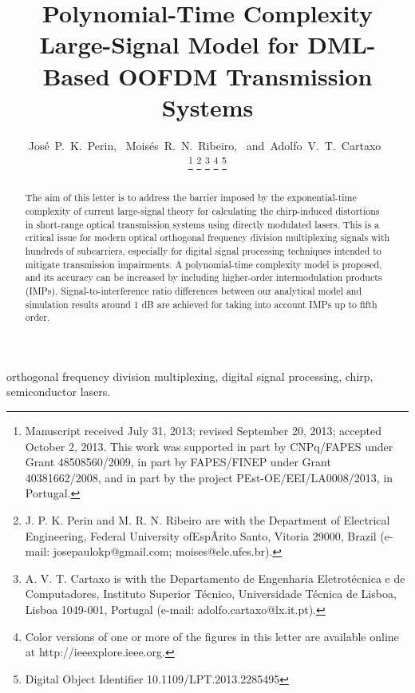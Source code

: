 \documentclass[journal]{IEEEtran}
\makeatletter
\def\markboth#1#2{\def\leftmark{\@IEEEcompsoconly{\sffamily}\MakeUppercase{\protect#1}}%
\def\rightmark{\@IEEEcompsoconly{\sffamily}\MakeUppercase{\protect#2}}}
\makeatother
\begin{document}
 
\title{Polynomial-Time Complexity Large-Signal Model for DML-Based OOFDM Transmission Systems}
\author{José~P.~K.~Perin,~\IEEEmembership{}
        Moisés~R.~N.~Ribeiro,~\IEEEmembership{}
        and~Adolfo~V.~T.~Cartaxo~%

\thanks{Manuscript received July 31, 2013; revised September 20, 2013; accepted October 2, 2013. This work was supported in part by CNPq/FAPES under Grant 48508560/2009, in part by FAPES/FINEP under Grant 40381662/2008, and in part by the project PEst-OE/EEI/LA0008/2013, in Portugal.}
\thanks{J. P. K. Perin and M. R. N. Ribeiro are with the Department of Electrical Engineering, Federal University ofEspÃrito Santo, Vitoria 29000, Brazil (e-mail: josepaulokp@gmail.com; moises@ele.ufes.br).}
\thanks{A. V. T. Cartaxo is with the Departamento de Engenharia Eletrotécnica e de Computadores, Instituto Superior Técnico, Universidade Técnica de Lisboa, Lisboa 1049-001, Portugal (e-mail: adolfo.cartaxo@lx.it.pt).}
\thanks{Color versions of one or more of the figures in this letter are available online at http://ieeexplore.ieee.org.}
\thanks{ Digital Object Identifier 10.1109/LPT.2013.2285495}
}

\markboth{IEEE PHOTONICS TECHNOLOGY LETTERS}{}%
\maketitle
\begin{abstract}
The aim of this letter is to address the barrier imposed by the exponential-time complexity of current large-signal theory for calculating the chirp-induced distortions in short-range optical transmission systems using directly modulated lasers. This is a critical issue for modern optical orthogonal frequency division multiplexing signals with hundreds of subcarriers, especially for digital signal processing techniques intended to mitigate transmission impairments. A polynomial-time complexity model is proposed, and its accuracy can be increased by including higher-order intermodulation products (IMPs). Signal-to-interference ratio differences between our analytical model and simulation results around 1 dB are achieved for taking into account IMPs up to fifth order. 
\end{abstract}
\begin{IEEEkeywords}
orthogonal frequency division multiplexing, digital signal processing, chirp, semiconductor lasers.
\end{IEEEkeywords}
\IEEEpeerreviewmaketitle
\end{document}
